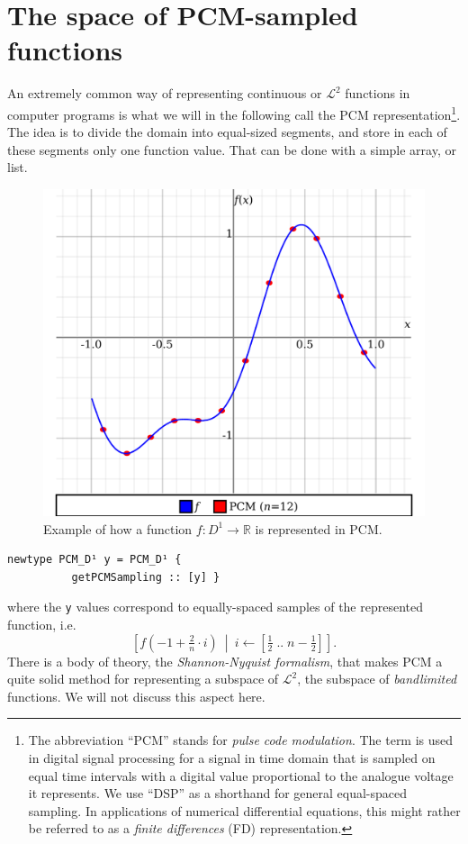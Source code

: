 \documentclass[final,sigplan]{acmart}\settopmatter{printfolios=true,printccs=false,printacmref=false}
\theoremstyle{acmplain}
\theoremstyle{acmdefinition}
\begin{document}
\section{The space of PCM-sampled functions}
An extremely common way of representing continuous or $\mathcal{L}^2$ functions in computer programs is what we will in the following call the PCM representation\footnote{%
The abbreviation “PCM” stands for \emph{pulse code modulation}. The term is used in digital signal processing for a signal in time domain that is sampled on equal time intervals with a digital value proportional to the analogue voltage it represents. We use “DSP” as a shorthand for general equal-spaced sampling. In applications of numerical differential equations, this might rather be referred to as a \emph{finite differences} (FD) representation.
}. The idea is to divide the domain into equal-sized segments, and store in each of these segments only one function value. That can be done with a simple array, or list.
\begin{figure}
 \centering
 \includegraphics[width=\linewidth]{simple-PCM-example.pdf}
 \caption{Example of how a function $f:D^1\to\mathbb{R}$ is represented in PCM.}
 \label{haarDomDecompose}
\end{figure}
\begin{lstlisting}
newtype PCM_D¹ y = PCM_D¹ {
          getPCMSampling :: [y] }
\end{lstlisting}
where the \lstinline`y` values correspond to equally-spaced samples of the represented function, i.e.
\[
  \left[f(-1 + \tfrac2n\cdot i)\ \middle|\ i\leftarrow[\tfrac12\;..\;n-\tfrac12]\right].
\]
There is a body of theory, the \emph{Shannon-Nyquist formalism}, that makes PCM a quite solid method for representing a subspace of $\mathcal{L}^2$, the subspace of \emph{bandlimited} functions. We will not discuss this aspect here. 
\end{document}
